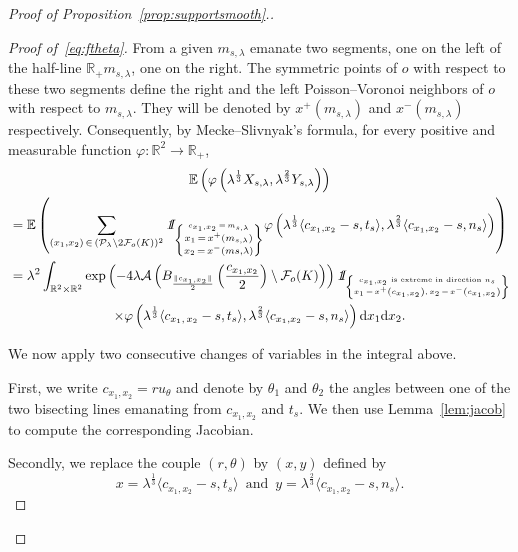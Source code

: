 \documentclass[10pt]{amsart}
\theoremstyle{definition}\newtheorem{defi}[theo]{Definition}\newtheorem{rema}[theo]{Remark}\newtheorem{exam}[theo]{Example}\newtheorem{exem}[theo]{Example}\newtheorem{nota}[theo]{Notation}
\newcommand{\indicat}{{\text{1}}\negthickspace\text{I}}
\newcommand{\cA}{\mathcal{A}}
\newcommand{\cF}{\mathcal{F}}
\newcommand{\cP}{\mathcal{P}}
\newcommand{\dd}{\mathrm{d}}
\newcommand{\E}{\mathbb{E}}
\newcommand{\R}{\mathbb{R}}
\newcommand{\pass}{\vspace{0.3cm}\noindent}
\newcommand{\noi}{\noindent}
\newenvironment*{prooff}{\begin{proof}}{\let\qed\relax\end{proof}}
\begin{document}
\begin{proof}[{Proof of Proposition~\ref{prop:supportsmooth}.}]
\begin{prooff}[{Proof of~\eqref{eq:ftheta}}]
From a given $m_{s,\lambda}$ emanate two segments, one on the left of the half-line $\R_+m_{s,\lambda}$, one on the right. The symmetric points of $o$ with respect to these two segments define the right and the left Poisson--Voronoi neighbors of $o$ with respect to $m_{s,\lambda}$. They will be denoted by $x^+(m_{s,\lambda})$ and $x^-(m_{s,\lambda})$ respectively. Consequently, by Mecke--Slivnyak's formula, for every positive and measurable function $\varphi:\R^2\longrightarrow \R_+$,
\begin{multline*}\label{eq:convloi}
\E\left(\varphi\left(\lambda^{\frac1{3}}X_{s,\lambda},\lambda^{\frac{2}{3}}Y_{s,\lambda}\right)\right) \\
\begin{aligned}
& = \E\left(\sum_{(x_1,x_2)\,\in\,(\cP_{\lambda}\setminus2\cF_o(K))^2} {\emph{\indicat}}_{\left\{\substack{\scriptscriptstyle c_{x_1,x_2}\,=\,m_{s,\lambda}\\
x_1\,=\,x^+(m_{s,\lambda})\\x_2\,=\,x^-(m{s,\lambda})}\right\}}
\varphi\left(\lambda^{\frac1{3}}\langle c_{x_1,x_2}-s,t_s\rangle,\lambda^{\frac{2}{3}}\langle c_{x_1,x_2}-s,n_s\rangle\right)\right) \\
& = \lambda^2\int_{\R^2\times\R^2}\exp\left(-4\lambda\cA\left(B_{\frac{\|c_{x_1,x_2}\|}{2}}\left(\frac{c_{x_1,x_2}}{2}\right)\setminus\cF_o(K)\right)\right) {\emph{\indicat}}_{\left\{
\substack{\scriptscriptstyle{c_{x_1,x_2}\text{ is extreme in direction }n_s}\\
\scriptscriptstyle{x_1\,=\,x^+\left(c_{x_1,x_2}\right),\, x_2\,=\,x^-\left(c_{x_1,x_2}\right)}}
\right\}}
\end{aligned}\\
\times\varphi\left(\lambda^{\frac{1}{3}}\langle c_{x_1,\,x_2}-s,t_s\rangle,\lambda^{\frac{2}{3}}\langle c_{x_1,x_2}-s,n_s\rangle\right)\dd x_1 \dd x_2.
\end{multline*}

We now apply two consecutive changes of variables in the integral above.

First, we write $c_{x_1,x_2}= ru_{\theta}$ and denote by $\theta_1$ and $\theta_2$ the angles between one of the two bisecting lines emanating from $c_{x_1,x_2}$ and $t_{s}$. We then use Lemma~\ref{lem:jacob} to compute the corresponding Jacobian.

Secondly, we replace the couple $(r,\theta)$ by $(x,y)$ defined by
\begin{equation*}\label{eq:xyh}
x=\lambda^{\frac1{3}}\langle c_{x_1,x_2}-s,t_s\rangle\,\text{ and }\, y=\lambda^{\frac{2}{3}}\langle c_{x_1,x_2}-s,n_s\rangle.
\end{equation*}


\end{prooff}
\end{proof}
\end{document}
